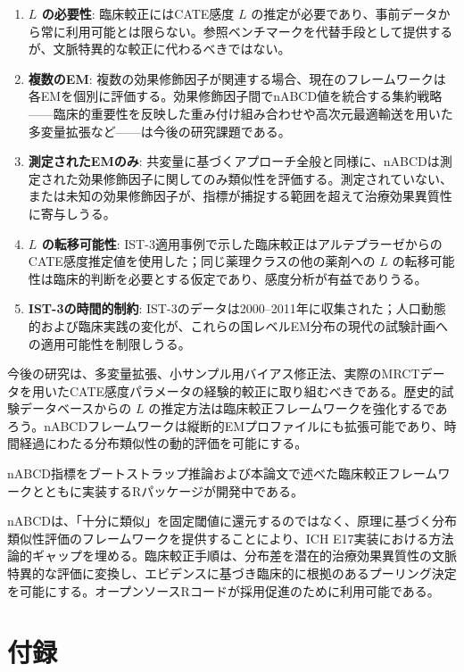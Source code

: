 \documentclass[
  a4paper,
  11pt]{ltjsarticle}
\begin{document}
\begin{enumerate}
  \(n \geq 100\)
  を信頼性のある点推定と信頼区間に推奨し、真のnABCDが約0.3を超える場合にカバレッジが低下しうることに注意を喚起する。
\item
  \textbf{\(L\) の必要性}: 臨床較正にはCATE感度 \(L\)
  の推定が必要であり、事前データから常に利用可能とは限らない。参照ベンチマークを代替手段として提供するが、文脈特異的な較正に代わるべきではない。
\item
  \textbf{複数のEM}:
  複数の効果修飾因子が関連する場合、現在のフレームワークは各EMを個別に評価する。効果修飾因子間でnABCD値を統合する集約戦略------臨床的重要性を反映した重み付け組み合わせや高次元最適輸送を用いた多変量拡張など------は今後の研究課題である。
\item
  \textbf{測定されたEMのみ}:
  共変量に基づくアプローチ全般と同様に、nABCDは測定された効果修飾因子に関してのみ類似性を評価する。測定されていない、または未知の効果修飾因子が、指標が捕捉する範囲を超えて治療効果異質性に寄与しうる。
\item
  \textbf{\(L\) の転移可能性}:
  IST-3適用事例で示した臨床較正はアルテプラーゼからのCATE感度推定値を使用した；同じ薬理クラスの他の薬剤への
  \(L\)
  の転移可能性は臨床的判断を必要とする仮定であり、感度分析が有益でありうる。
\item
  \textbf{IST-3の時間的制約}:
  IST-3のデータは2000--2011年に収集された；人口動態的および臨床実践の変化が、これらの国レベルEM分布の現代の試験計画への適用可能性を制限しうる。
\end{enumerate}

今後の研究は、多変量拡張、小サンプル用バイアス修正法、実際のMRCTデータを用いたCATE感度パラメータの経験的較正に取り組むべきである。歴史的試験データベースからの
\(L\)
の推定方法は臨床較正フレームワークを強化するであろう。nABCDフレームワークは縦断的EMプロファイルにも拡張可能であり、時間経過にわたる分布類似性の動的評価を可能にする。

nABCD指標をブートストラップ推論および本論文で述べた臨床較正フレームワークとともに実装するRパッケージが開発中である。

nABCDは、「十分に類似」を固定閾値に還元するのではなく、原理に基づく分布類似性評価のフレームワークを提供することにより、ICH
E17実装における方法論的ギャップを埋める。臨床較正手順は、分布差を潜在的治療効果異質性の文脈特異的な評価に変換し、エビデンスに基づき臨床的に根拠のあるプーリング決定を可能にする。オープンソースRコードが採用促進のために利用可能である。

\section*{付録}\label{ux4ed8ux9332}
\end{document}
